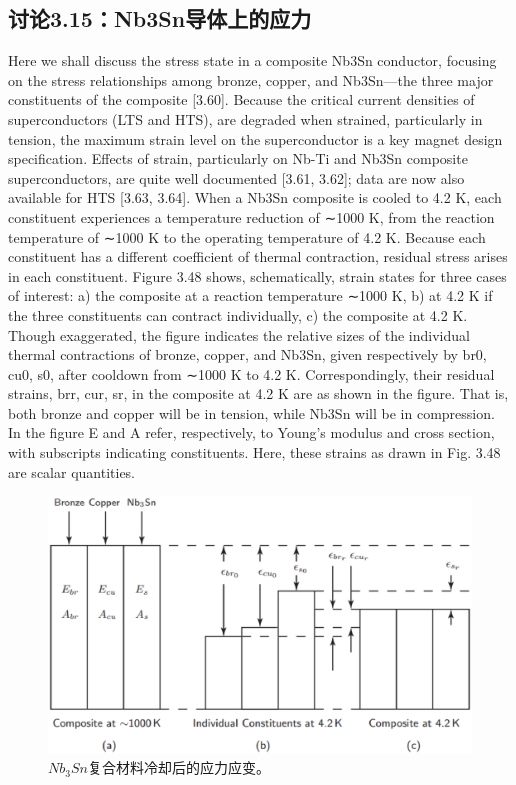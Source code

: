 \subsection{讨论3.15：Nb3Sn导体上的应力}
Here we shall discuss the stress state in a composite Nb3Sn conductor, focusing on
the stress relationships among bronze, copper, and Nb3Sn—the three major constituents of the composite [3.60]. Because the critical current densities of superconductors (LTS and HTS), are degraded when strained, particularly in tension, the
maximum strain level on the superconductor is a key magnet design specification.
Effects of strain, particularly on Nb-Ti and Nb3Sn composite superconductors, are
quite well documented [3.61, 3.62]; data are now also available for HTS [3.63, 3.64].
When a Nb3Sn composite is cooled to 4.2 K, each constituent experiences a temperature reduction of ∼1000 K, from the reaction temperature of ∼1000 K to the
operating temperature of 4.2 K. Because each constituent has a different coefficient
of thermal contraction, residual stress arises in each constituent.
Figure 3.48 shows, schematically, strain states for three cases of interest: a) the
composite at a reaction temperature ∼1000 K, b) at 4.2 K if the three constituents
can contract individually, c) the composite at 4.2 K. Though exaggerated, the figure indicates the relative sizes of the individual thermal contractions of bronze,
copper, and Nb3Sn, given respectively by br0, cu0, s0, after cooldown from
∼1000 K to 4.2 K. Correspondingly, their residual strains, brr, cur, sr, in the
composite at 4.2 K are as shown in the figure. That is, both bronze and copper
will be in tension, while Nb3Sn will be in compression. In the figure E and A refer, respectively, to Young’s modulus and cross section, with subscripts indicating
constituents. Here, these strains as drawn in Fig. 3.48 are scalar quantities.
\begin{figure}[htbp]
	\centering
	\includegraphics[scale=0.5]{chpt3/figs/fig3.48.eps}
	\caption{$Nb_3Sn$复合材料冷却后的应力应变。}
\end{figure}

